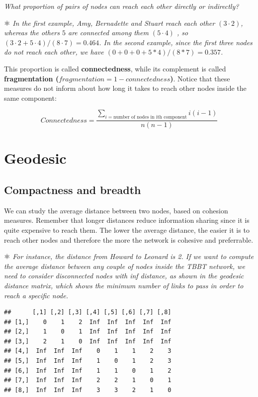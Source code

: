 \documentclass[
  notitlepage,
  onecolumn,
  openany]{book}
\newenvironment{Shaded}{\begin{snugshade}}{\end{snugshade}}
\newcommand{\FunctionTok}[1]{\textcolor[rgb]{0.00,0.00,0.00}{#1}}
\newcommand{\NormalTok}[1]{#1}
\newcommand{\SpecialCharTok}[1]{\textcolor[rgb]{0.00,0.00,0.00}{#1}}
\begin{document}
\emph{What proportion of pairs of nodes can reach each other directly or indirectly?}

⚛️ \emph{In the first example, Amy, Bernadette and Stuart reach each other \((3\cdot2)\), whereas the others \(5\) are connected among them \((5\cdot4)\) , so \((3\cdot2+5\cdot4)/(8\cdot7) = 0.464\).
In the second example, since the first three nodes do not reach each other, we have \((0+0+0+5*4)/(8*7) = 0.357\).}

This proportion is called \textbf{connectedness}, while its complement is called \textbf{fragmentation (\(fragmentation = 1-connectedness\))}. Notice that these measures do not inform about how long it takes to reach other nodes inside the same component:

\[
Connectedness = \frac{\sum_{i = \text{number of nodes in ith component}} i(i-1)}{n(n-1)}
\]

\hypertarget{geodesic}{%
\section{Geodesic}\label{geodesic}}

\hypertarget{compactness-and-breadth}{%
\subsection{Compactness and breadth}\label{compactness-and-breadth}}

We can study the average distance between two nodes, based on cohesion measures. Remember that longer distances reduce information sharing since it is quite expensive to reach them. The lower the average distance, the easier it is to reach other nodes and therefore the more the network is cohesive and preferrable.

⚛️ \emph{For instance, the distance from Howard to Leonard is 2. If we want to compute the average distance between any couple of nodes inside the TBBT network, we need to consider disconnected nodes with inf distance, as shown in the geodesic distance matrix, which shows the minimum number of links to pass in order to reach a specific node.}

\begin{Shaded}
\end{Shaded}

\begin{verbatim}
##      [,1] [,2] [,3] [,4] [,5] [,6] [,7] [,8]
## [1,]    0    1    2  Inf  Inf  Inf  Inf  Inf
## [2,]    1    0    1  Inf  Inf  Inf  Inf  Inf
## [3,]    2    1    0  Inf  Inf  Inf  Inf  Inf
## [4,]  Inf  Inf  Inf    0    1    1    2    3
## [5,]  Inf  Inf  Inf    1    0    1    2    3
## [6,]  Inf  Inf  Inf    1    1    0    1    2
## [7,]  Inf  Inf  Inf    2    2    1    0    1
## [8,]  Inf  Inf  Inf    3    3    2    1    0
\end{verbatim}
\end{document}
